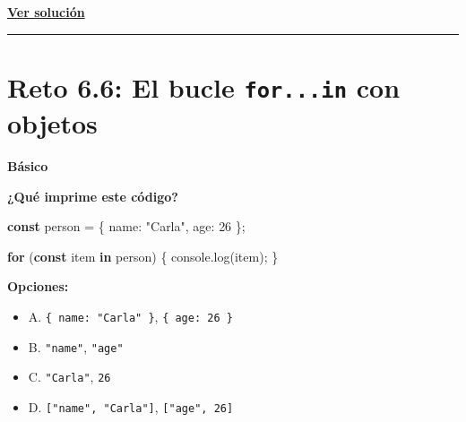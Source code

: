 \documentclass[
  letterpaper,
  DIV=11,
  numbers=noendperiod]{scrreprt}
\newenvironment{Shaded}{\begin{snugshade}}{\end{snugshade}}
\newcommand{\BuiltInTok}[1]{\textcolor[rgb]{0.00,0.23,0.31}{#1}}
\newcommand{\ControlFlowTok}[1]{\textcolor[rgb]{0.00,0.23,0.31}{\textbf{#1}}}
\newcommand{\DataTypeTok}[1]{\textcolor[rgb]{0.68,0.00,0.00}{#1}}
\newcommand{\DecValTok}[1]{\textcolor[rgb]{0.68,0.00,0.00}{#1}}
\newcommand{\FunctionTok}[1]{\textcolor[rgb]{0.28,0.35,0.67}{#1}}
\newcommand{\KeywordTok}[1]{\textcolor[rgb]{0.00,0.23,0.31}{\textbf{#1}}}
\newcommand{\NormalTok}[1]{\textcolor[rgb]{0.00,0.23,0.31}{#1}}
\newcommand{\OperatorTok}[1]{\textcolor[rgb]{0.37,0.37,0.37}{#1}}
\newcommand{\StringTok}[1]{\textcolor[rgb]{0.13,0.47,0.30}{#1}}
\providecommand{\tightlist}{%
  \setlength{\itemsep}{0pt}\setlength{\parskip}{0pt}}
\begin{document}
\textbf{\hyperref[sec-sol-cap6-reto5]{Ver solución}}

\begin{center}\rule{0.5\linewidth}{0.5pt}\end{center}

\section{\texorpdfstring{Reto 6.6: El bucle \texttt{for...in} con
objetos}{Reto 6.6: El bucle for...in con objetos}}\label{sec-cap6-reto6}

\begin{tcolorbox}[enhanced jigsaw, left=2mm, toprule=.15mm, leftrule=.75mm, breakable, colback=white, coltitle=black, bottomtitle=1mm, arc=.35mm, rightrule=.15mm, colframe=quarto-callout-caution-color-frame, opacitybacktitle=0.6, toptitle=1mm, opacityback=0, titlerule=0mm, title=\textcolor{quarto-callout-caution-color}{\faFire}\hspace{0.5em}{Dificultad}, bottomrule=.15mm, colbacktitle=quarto-callout-caution-color!10!white]

\textbf{Básico}

\end{tcolorbox}

\textbf{¿Qué imprime este código?}

\begin{Shaded}
\begin{Highlighting}[]
\KeywordTok{const}\NormalTok{ person }\OperatorTok{=}\NormalTok{ \{}
  \DataTypeTok{name}\OperatorTok{:} \StringTok{"Carla"}\OperatorTok{,}
  \DataTypeTok{age}\OperatorTok{:} \DecValTok{26}
\NormalTok{\}}\OperatorTok{;}

\ControlFlowTok{for}\NormalTok{ (}\KeywordTok{const}\NormalTok{ item }\KeywordTok{in}\NormalTok{ person) \{}
  \BuiltInTok{console}\OperatorTok{.}\FunctionTok{log}\NormalTok{(item)}\OperatorTok{;}
\NormalTok{\}}
\end{Highlighting}
\end{Shaded}

\textbf{Opciones:}

\begin{itemize}
\tightlist
\item
  A. \texttt{\{\ name:\ "Carla"\ \}}, \texttt{\{\ age:\ 26\ \}}
\item
  B. \texttt{"name"}, \texttt{"age"}
\item
  C. \texttt{"Carla"}, \texttt{26}
\item
  D. \texttt{{[}"name",\ "Carla"{]}}, \texttt{{[}"age",\ 26{]}}
\end{itemize}
\end{document}
